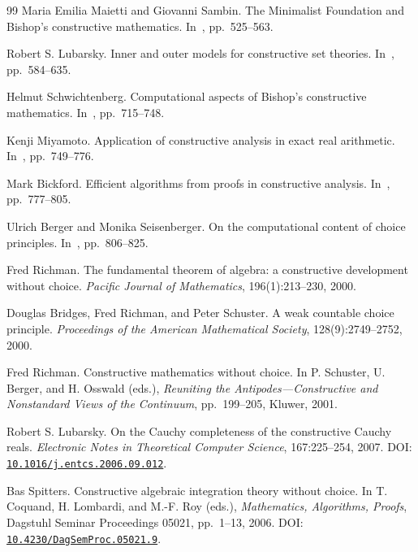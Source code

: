 \documentclass[11pt]{article}
\theoremstyle{definition}
\theoremstyle{remark}
\newcommand{\doi}[1]{\href{https://doi.org/#1}{\texttt{#1}}}
\begin{document}
\begin{thebibliography}{99}
Maria Emilia Maietti and Giovanni Sambin.
\newblock The Minimalist Foundation and Bishop's constructive mathematics.
\newblock In~\cite{handbook-2023}, pp.~525--563.

Robert S. Lubarsky.
\newblock Inner and outer models for constructive set theories.
\newblock In~\cite{handbook-2023}, pp.~584--635.

Helmut Schwichtenberg.
\newblock Computational aspects of Bishop's constructive mathematics.
\newblock In~\cite{handbook-2023}, pp.~715--748.

Kenji Miyamoto.
\newblock Application of constructive analysis in exact real arithmetic.
\newblock In~\cite{handbook-2023}, pp.~749--776.

Mark Bickford.
\newblock Efficient algorithms from proofs in constructive analysis.
\newblock In~\cite{handbook-2023}, pp.~777--805.

Ulrich Berger and Monika Seisenberger.
\newblock On the computational content of choice principles.
\newblock In~\cite{handbook-2023}, pp.~806--825.

Fred Richman.
\newblock The fundamental theorem of algebra: a constructive development without choice.
\newblock \emph{Pacific Journal of Mathematics}, 196(1):213--230, 2000.

Douglas Bridges, Fred Richman, and Peter Schuster.
\newblock A weak countable choice principle.
\newblock \emph{Proceedings of the American Mathematical Society}, 128(9):2749--2752, 2000.

Fred Richman.
\newblock Constructive mathematics without choice.
\newblock In P. Schuster, U. Berger, and H. Osswald (eds.), \emph{Reuniting the Antipodes---Constructive and Nonstandard Views of the Continuum}, pp.~199--205, Kluwer, 2001.

Robert S. Lubarsky.
\newblock On the Cauchy completeness of the constructive Cauchy reals.
\newblock \emph{Electronic Notes in Theoretical Computer Science}, 167:225--254, 2007.
\newblock DOI: \doi{10.1016/j.entcs.2006.09.012}.

Bas Spitters.
\newblock Constructive algebraic integration theory without choice.
\newblock In T. Coquand, H. Lombardi, and M.-F. Roy (eds.), \emph{Mathematics, Algorithms, Proofs}, Dagstuhl Seminar Proceedings 05021, pp.~1--13, 2006.
\newblock DOI: \doi{10.4230/DagSemProc.05021.9}.


\end{thebibliography}
\end{document}
